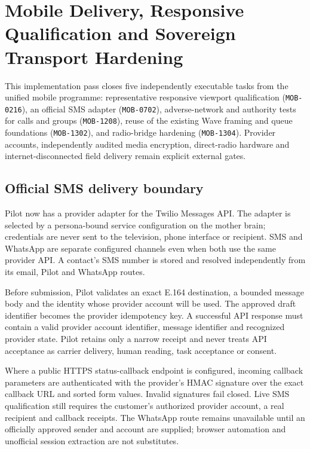 \section{Mobile Delivery, Responsive Qualification and Sovereign Transport Hardening}
\label{sec:pilot-sms-viewport-call-wave-hardening}

This implementation pass closes five independently executable tasks from the unified
mobile programme: representative responsive viewport qualification
(\texttt{MOB-0216}), an official SMS adapter (\texttt{MOB-0702}), adverse-network
and authority tests for calls and groups (\texttt{MOB-1208}), reuse of the existing
Wave framing and queue foundations (\texttt{MOB-1302}), and radio-bridge hardening
(\texttt{MOB-1304}).  Provider accounts, independently audited media encryption,
direct-radio hardware and internet-disconnected field delivery remain explicit
external gates.

\subsection{Official SMS delivery boundary}

Pilot now has a provider adapter for the Twilio Messages API.  The adapter is
selected by a persona-bound service configuration on the mother brain; credentials
are never sent to the television, phone interface or recipient.  SMS and WhatsApp
are separate configured channels even when both use the same provider API.  A
contact's SMS number is stored and resolved independently from its email, Pilot and
WhatsApp routes.

Before submission, Pilot validates an exact E.164 destination, a bounded message
body and the identity whose provider account will be used.  The approved draft
identifier becomes the provider idempotency key.  A successful API response must
contain a valid provider account identifier, message identifier and recognized
provider state.  Pilot retains only a narrow receipt and never treats API acceptance
as carrier delivery, human reading, task acceptance or consent.

Where a public HTTPS status-callback endpoint is configured, incoming callback
parameters are authenticated with the provider's HMAC signature over the exact
callback URL and sorted form values.  Invalid signatures fail closed.  Live SMS
qualification still requires the customer's authorized provider account, a real
recipient and callback receipts.  The WhatsApp route remains unavailable until an
officially approved sender and account are supplied; browser automation and
unofficial session extraction are not substitutes.

